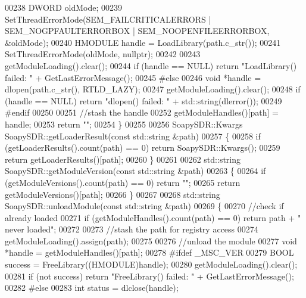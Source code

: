 \begin{DoxyCode}
{00238     DWORD oldMode;
00239     SetThreadErrorMode(SEM\_FAILCRITICALERRORS | SEM\_NOGPFAULTERRORBOX | SEM\_NOOPENFILEERRORBOX, &oldMode);
00240     HMODULE handle = LoadLibrary(path.c\_str());
00241     SetThreadErrorMode(oldMode, \textcolor{keyword}{nullptr});
00242 
00243     getModuleLoading().clear();
00244     \textcolor{keywordflow}{if} (handle == NULL) \textcolor{keywordflow}{return} \textcolor{stringliteral}{"LoadLibrary() failed: "} + GetLastErrorMessage();
00245 \textcolor{preprocessor}{#else}
00246     \textcolor{keywordtype}{void} *handle = dlopen(path.c\_str(), RTLD\_LAZY);
00247     getModuleLoading().clear();
00248     \textcolor{keywordflow}{if} (handle == NULL) \textcolor{keywordflow}{return} \textcolor{stringliteral}{"dlopen() failed: "} + std::string(dlerror());
00249 \textcolor{preprocessor}{#endif}
00250 
00251     \textcolor{comment}{//stash the handle}
00252     getModuleHandles()[path] = handle;
00253     \textcolor{keywordflow}{return} \textcolor{stringliteral}{""};
00254 \}
00255 
00256 SoapySDR::Kwargs SoapySDR::getLoaderResult(\textcolor{keyword}{const} std::string &path)
00257 \{
00258     \textcolor{keywordflow}{if} (getLoaderResults().count(path) == 0) \textcolor{keywordflow}{return} SoapySDR::Kwargs();
00259     \textcolor{keywordflow}{return} getLoaderResults()[path];
00260 \}
00261 
00262 std::string SoapySDR::getModuleVersion(\textcolor{keyword}{const} std::string &path)
00263 \{
00264     \textcolor{keywordflow}{if} (getModuleVersions().count(path) == 0) \textcolor{keywordflow}{return} \textcolor{stringliteral}{""};
00265     \textcolor{keywordflow}{return} getModuleVersions()[path];
00266 \}
00267 
00268 std::string SoapySDR::unloadModule(\textcolor{keyword}{const} std::string &path)
00269 \{
00270     \textcolor{comment}{//check if already loaded}
00271     \textcolor{keywordflow}{if} (getModuleHandles().count(path) == 0) \textcolor{keywordflow}{return} path + \textcolor{stringliteral}{" never loaded"};
00272 
00273     \textcolor{comment}{//stash the path for registry access}
00274     getModuleLoading().assign(path);
00275 
00276     \textcolor{comment}{//unload the module}
00277     \textcolor{keywordtype}{void} *handle = getModuleHandles()[path];
00278 \textcolor{preprocessor}{#ifdef \_MSC\_VER}
00279     BOOL success = FreeLibrary((HMODULE)handle);
00280     getModuleLoading().clear();
00281     \textcolor{keywordflow}{if} (not success) \textcolor{keywordflow}{return} \textcolor{stringliteral}{"FreeLibrary() failed: "} + GetLastErrorMessage();
00282 \textcolor{preprocessor}{#else}
00283     \textcolor{keywordtype}{int} status = dlclose(handle);
}
\end{DoxyCode}

